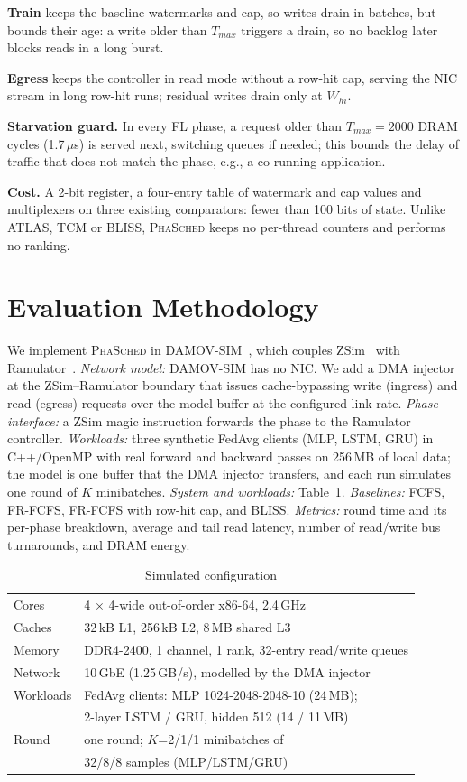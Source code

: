 \documentclass[conference]{IEEEtran}
\newcommand{\name}{\textsc{PhaSched}}
\begin{document}
\textbf{Train} keeps the baseline watermarks and cap, so writes drain in batches, but bounds their age: a write older than $T_{max}$ triggers a drain, so no backlog later blocks reads in a long burst.

\textbf{Egress} keeps the controller in read mode without a row-hit cap, serving the NIC stream in long row-hit runs; residual writes drain only at $W_{hi}$.

\textbf{Starvation guard.} In every FL phase, a request older than $T_{max}=2000$ DRAM cycles (1.7\,$\mu$s) is served next, switching queues if needed; this bounds the delay of traffic that does not match the phase, e.g., a co-running application.

\textbf{Cost.} A 2-bit register, a four-entry table of watermark and cap values and multiplexers on three existing comparators: fewer than 100 bits of state. Unlike ATLAS, TCM or BLISS, \name{} keeps no per-thread counters and performs no ranking.
\section{Evaluation Methodology}
We implement \name{} in DAMOV-SIM~\cite{damov}, which couples ZSim~\cite{zsim} with Ramulator~\cite{ramulator}. \emph{Network model:} DAMOV-SIM has no NIC. We add a DMA injector at the ZSim--Ramulator boundary that issues cache-bypassing write (ingress) and read (egress) requests over the model buffer at the configured link rate. \emph{Phase interface:} a ZSim magic instruction forwards the phase to the Ramulator controller.  \emph{Workloads:} three synthetic FedAvg clients (MLP, LSTM, GRU) in C++/OpenMP with real forward and backward passes on 256\,MB of local data; the model is one buffer that the DMA injector transfers, and each run simulates one round of $K$ minibatches.
\emph{System and workloads:} Table~\ref{tab:config}. \emph{Baselines:} FCFS, FR-FCFS, FR-FCFS with row-hit cap, and BLISS. \emph{Metrics:} round time and its per-phase breakdown, average and tail read latency, number of read/write bus turnarounds, and DRAM energy.

\begin{table}[t]
\centering
\caption{Simulated configuration}
\label{tab:config}
\footnotesize
\begin{tabular}{@{}ll@{}}
\toprule
Cores & 4 $\times$ 4-wide out-of-order x86-64, 2.4\,GHz \\
Caches & 32\,kB L1, 256\,kB L2, 8\,MB shared L3 \\
Memory & DDR4-2400, 1 channel, 1 rank, 32-entry read/write queues \\
Network & 10\,GbE (1.25\,GB/s), modelled by the DMA injector \\
Workloads & FedAvg clients: MLP 1024-2048-2048-10 (24\,MB); \\
 & 2-layer LSTM / GRU, hidden 512 (14 / 11\,MB) \\
Round & one round; $K$=2/1/1 minibatches of \\
 & 32/8/8 samples (MLP/LSTM/GRU) \\
\bottomrule
\end{tabular}
\end{table}
\end{document}
